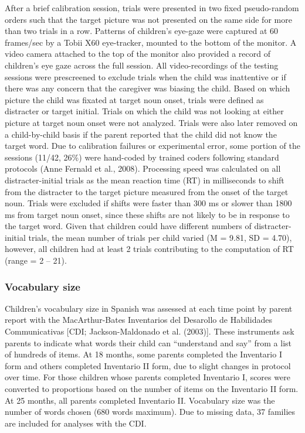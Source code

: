 \documentclass[
  man,floatsintext]{apa6}
\begin{document}
After a brief calibration session, trials were presented in two fixed pseudo-random orders such that the target picture was not presented on the same side for more than two trials in a row. Patterns of children's eye-gaze were captured at 60 frames/sec by a Tobii X60 eye-tracker, mounted to the bottom of the monitor. A video camera attached to the top of the monitor also provided a record of children's eye gaze across the full session. All video-recordings of the testing sessions were prescreened to exclude trials when the child was inattentive or if there was any concern that the caregiver was biasing the child. Based on which picture the child was fixated at target noun onset, trials were defined as distracter or target initial. Trials on which the child was not looking at either picture at target noun onset were not analyzed. Trials were also later removed on a child-by-child basis if the parent reported that the child did not know the target word. Due to calibration failures or experimental error, some portion of the sessions (11/42, 26\%) were hand-coded by trained coders following standard protocols (Anne Fernald et al., 2008). Processing speed was calculated on all distracter-initial trials as the mean reaction time (RT) in milliseconds to shift from the distracter to the target picture measured from the onset of the target noun. Trials were excluded if shifts were faster than 300 ms or slower than 1800 ms from target noun onset, since these shifts are not likely to be in response to the target word. Given that children could have different numbers of distracter-initial trials, the mean number of trials per child varied (M = 9.81, SD = 4.70), however, all children had at least 2 trials contributing to the computation of RT (range = 2 -- 21).

\hypertarget{vocabulary-size}{%
\subsubsection{Vocabulary size}\label{vocabulary-size}}

Children's vocabulary size in Spanish was assessed at each time point by parent report with the MacArthur-Bates Inventarios del Desarollo de Habilidades Communicativas {[}CDI; Jackson-Maldonado et al. (2003){]}. These instruments ask parents to indicate what words their child can ``understand and say'' from a list of hundreds of items. At 18 months, some parents completed the Inventario I form and others completed Inventario II form, due to slight changes in protocol over time. For those children whose parents completed Inventario I, scores were converted to proportions based on the number of items on the Inventario II form. At 25 months, all parents completed Inventario II. Vocabulary size was the number of words chosen (680 words maximum). Due to missing data, 37 families are included for analyses with the CDI.
\end{document}
